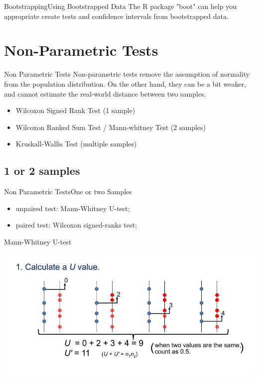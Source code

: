 \begin{frame}{Bootstrapping}{Using Bootstrapped Data}
  The R package "boot" can help you appropriate create tests
  and confidence intervals from bootstrapped data.
\end{frame}

\section{Non-Parametric Tests}

\begin{frame}{Non Parametric Tests}{}
  Non-parametric tests remove the assumption of normality from the
  population distribution. On the other hand, they can be a bit weaker, and
  cannot estimate the real-world distance between two samples.
  \bigskip

  \begin{itemize}
    \item Wilcoxon Signed Rank Test (1 sample)
    \item Wilcoxon Ranked Sum Test / Mann-whitney Test (2 samples)
    \item Kruskall-Wallis Test (multiple samples)
  \end{itemize}
\end{frame}


\subsection{1 or 2 samples}

\begin{frame}{Non Parametric Tests}{One or two Samples}
  \begin{itemize}
    \item unpaired test: Mann-Whitney U-test;
    \item paired test: Wilcoxon signed-ranks test;
  \end{itemize}
\end{frame}

\begin{frame}{Mann-Whitney U-test}{}
  \begin{center}
    \includegraphics[width=1\textwidth]{../img/MannWhitneyU}
  \end{center}
\end{frame}

